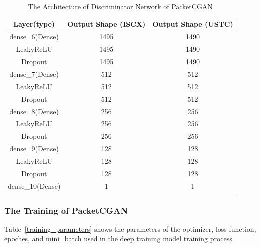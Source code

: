 \documentclass[conference]{IEEEtran}
\begin{document}
\linespread{1.5}
\begin{table}[htbp]
	\caption{The Architecture of Discriminator Network of PacketCGAN}
	\fontsize{6.5}{8}\selectfont  
	\begin{center}
		\begin{tabular}{c| c| c}
			\hline
			\textbf{Layer(type)}&{\textbf{Output Shape (ISCX)}} &{\textbf{Output Shape (USTC)}} \\
			\hline
			dense\_6(Dense) 	& 1495 	& 1490  \\
			LeakyReLU 			& 1495  	& 1490   \\
			Dropout 				& 1495  	& 1490   \\
			dense\_7(Dense) 	& 512 	& 512	\\
			LeakyReLU 			& 512	& 512    \\
			Dropout 				& 512  	& 512   \\
			dense\_8(Dense) 	& 256 	& 256   \\
			LeakyReLU 			& 256	& 256   \\
			Dropout 				& 256  	& 256   \\
			dense\_9(Dense)		 & 128 	& 128	\\
			LeakyReLU 			& 128		& 128 \\
			Dropout 				& 128  	& 128   \\	
			dense\_10(Dense) 	& 1  	& 1   \\
			
			\hline
		\end{tabular}
		\label{tab:discriminator}
	\end{center}
\end{table}



\subsubsection {The Training of PacketCGAN}
Table~\ref{training_parameters} shows the parameters of the optimizer, loss function, epoches, and mini\_batch used in the deep training model training process.
\end{document}
